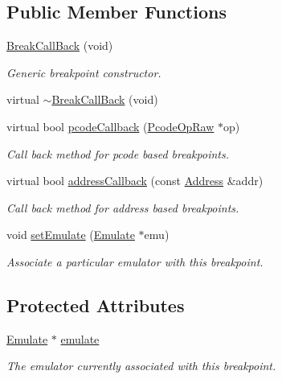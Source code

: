 \subsection*{Public Member Functions}
\begin{DoxyCompactItemize}
\item 
\mbox{\hyperlink{class_break_call_back_a40f84ad3345a12ea46550bdc41f6ba6a}{Break\+Call\+Back}} (void)
\begin{DoxyCompactList}\small\item\em Generic breakpoint constructor. \end{DoxyCompactList}\item 
virtual \mbox{\hyperlink{class_break_call_back_ae2a936acfd580471dde37225a63a8ab2}{$\sim$\+Break\+Call\+Back}} (void)
\item 
virtual bool \mbox{\hyperlink{class_break_call_back_a93cd065c519c0e08e2c7729cb649f236}{pcode\+Callback}} (\mbox{\hyperlink{class_pcode_op_raw}{Pcode\+Op\+Raw}} $\ast$op)
\begin{DoxyCompactList}\small\item\em Call back method for pcode based breakpoints. \end{DoxyCompactList}\item 
virtual bool \mbox{\hyperlink{class_break_call_back_adb97ba6b111cb9a84856c9e0f9d506f9}{address\+Callback}} (const \mbox{\hyperlink{class_address}{Address}} \&addr)
\begin{DoxyCompactList}\small\item\em Call back method for address based breakpoints. \end{DoxyCompactList}\item 
void \mbox{\hyperlink{class_break_call_back_a22f41c29017f4977efde2a489b07592b}{set\+Emulate}} (\mbox{\hyperlink{class_emulate}{Emulate}} $\ast$emu)
\begin{DoxyCompactList}\small\item\em Associate a particular emulator with this breakpoint. \end{DoxyCompactList}\end{DoxyCompactItemize}
\subsection*{Protected Attributes}
\begin{DoxyCompactItemize}
\item 
\mbox{\hyperlink{class_emulate}{Emulate}} $\ast$ \mbox{\hyperlink{class_break_call_back_a8047349836361935e9885bd36819255c}{emulate}}
\begin{DoxyCompactList}\small\item\em The emulator currently associated with this breakpoint. \end{DoxyCompactList}\end{DoxyCompactItemize}



